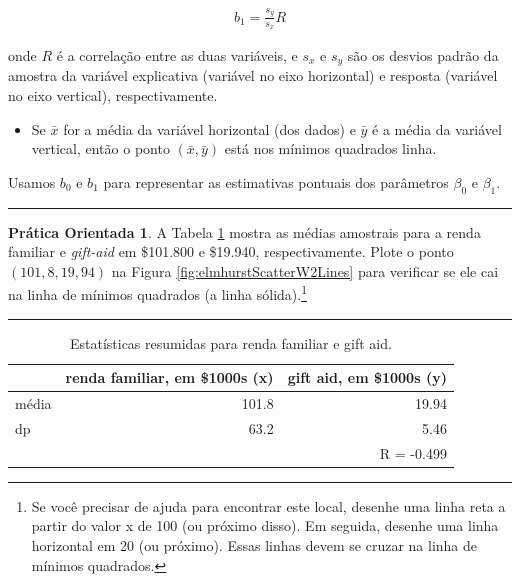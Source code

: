 \documentclass[
]{book}
\providecommand{\tightlist}{%
  \setlength{\itemsep}{0pt}\setlength{\parskip}{0pt}}
\theoremstyle{definition}
\theoremstyle{definition}
\theoremstyle{definition}
\newtheorem{exercise}{Prática Orientada}[chapter]
\theoremstyle{definition}
\theoremstyle{remark}
\begin{document}
\begin{eqnarray}
b_1 = \frac{s_y}{s_x} R
\label{eq:slopeOfLSRLine}
\end{eqnarray}

onde \(R\) é a correlação entre as duas variáveis, e \(s_x\) e \(s_y\) são os desvios padrão da amostra da variável explicativa (variável no eixo horizontal) e resposta (variável no eixo vertical), respectivamente.

\begin{itemize}
\tightlist
\item
  Se \(\bar{x}\) for a média da variável horizontal (dos dados) e \(\bar{y}\) é a média da variável vertical, então o ponto \((\bar{x}, \bar{y})\) está nos mínimos quadrados linha.
\end{itemize}

Usamos \(b_0\) e \(b_1\) para representar as estimativas pontuais dos parâmetros \(\beta_0\) e \(\beta_1\).

\begin{center}\rule{0.5\linewidth}{0.5pt}\end{center}

\begin{exercise}
\protect\hypertarget{exr:unnamed-chunk-274}{}{\label{exr:unnamed-chunk-274} }A Tabela \ref{tab:summaryStatsOfSATGPAData} mostra as médias amostrais para a renda familiar e \emph{gift-aid} em \$101.800 e \$19.940, respectivamente. Plote o ponto \((101,8, 19,94)\) na Figura \ref{fig:elmhurstScatterW2Lines} para verificar se ele cai na linha de mínimos quadrados (a linha sólida).\footnote{Se você precisar de ajuda para encontrar este local, desenhe uma linha reta a partir do valor x de 100 (ou próximo disso). Em seguida, desenhe uma linha horizontal em 20 (ou próximo). Essas linhas devem se cruzar na linha de mínimos quadrados.}
\end{exercise}

\begin{center}\rule{0.5\linewidth}{0.5pt}\end{center}

\begin{table}

\caption{\label{tab:summaryStatsOfSATGPAData}Estatísticas resumidas para renda familiar e gift aid.}
\centering
\begin{tabular}[t]{l|r|r}
\hline
  & renda familiar, em \$1000s (x) & gift aid, em \$1000s (y)\\
\hline
média & 101.8 & 19.94\\
\hline
dp & 63.2 & 5.46\\
\hline
 &  & R = -0.499\\
\hline
\end{tabular}
\end{table}
\end{document}
